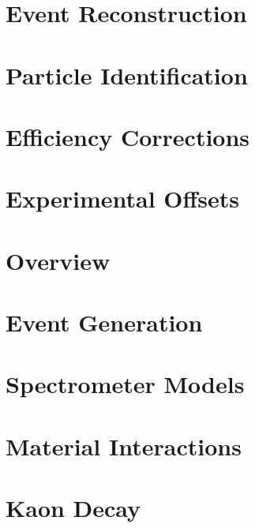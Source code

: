 \documentclass[
]{report}
\begin{document}
\hypertarget{Section-5.4}{%
\section{Event Reconstruction}\label{Section-5.4}}

\hypertarget{Section-5.5}{%
\section{Particle Identification}\label{Section-5.5}}

\hypertarget{Section-5.6}{%
\section{Efficiency Corrections}\label{Section-5.6}}

\hypertarget{Section-5.7}{%
\section{Experimental Offsets}\label{Section-5.7}}

\label{Chapter-6}

\hypertarget{Section-6.1}{%
\section{Overview}\label{Section-6.1}}

\hypertarget{Section-6.2}{%
\section{Event Generation}\label{Section-6.2}}

\hypertarget{Section-6.3}{%
\section{Spectrometer Models}\label{Section-6.3}}

\hypertarget{Section-6.4}{%
\section{Material Interactions}\label{Section-6.4}}

\hypertarget{Section-6.5}{%
\section{Kaon Decay}\label{Section-6.5}}
\end{document}
